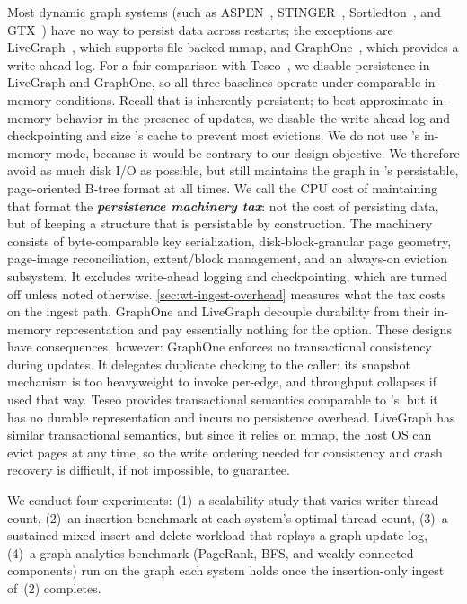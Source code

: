 Most dynamic graph systems (such as ASPEN~\cite{10.1145/3314221.3314598}, STINGER~\cite{stinger2012ediger}, Sortledton~\cite{sortledton2022Fuchs}, and GTX~\cite{libinzhou2025GTX}) have no way to persist data across restarts; the exceptions are LiveGraph~\cite{zhu2019livegraph}, which supports file-backed mmap, and GraphOne~\cite{graphone2019kumar}, which provides a write-ahead log.
For a fair comparison with Teseo~\cite{teseo2021deLeo}, we disable persistence in LiveGraph and GraphOne, so all three baselines operate under comparable in-memory conditions.
Recall that \project{} is inherently persistent; to best approximate in-memory behavior in the presence of updates, we disable the write-ahead log and checkpointing and size \wt{}'s cache to prevent most evictions.
We do not use \wt{}'s in-memory mode, because it would be contrary to our design objective.
We therefore avoid as much disk I/O as possible, but \project{} still maintains the graph in \wt{}'s persistable, page-oriented B-tree format at all times.
We call the CPU cost of maintaining that format the \textbf{\emph{persistence machinery tax}}: not the cost of persisting data, but of keeping a structure that is persistable by construction.
The machinery consists of byte-comparable key serialization, disk-block-granular page geometry, page-image reconciliation, extent/block management, and an always-on eviction subsystem.
It excludes write-ahead logging and checkpointing, which are turned off unless noted otherwise.
\autoref{sec:wt-ingest-overhead} measures what the tax costs on the ingest path.
GraphOne and LiveGraph decouple durability from their in-memory representation and pay essentially nothing for the option.
These designs have consequences, however: GraphOne enforces no transactional consistency during updates.
It delegates duplicate checking to the caller; its snapshot mechanism is too heavyweight to invoke per-edge, and throughput collapses if used that way.
Teseo provides transactional semantics comparable to \project{}'s, but it has no durable representation and incurs no persistence overhead.
LiveGraph has similar transactional semantics, but since it relies on mmap, the host OS can evict pages at any time, so the write ordering needed for consistency and crash recovery is difficult, if not impossible, to guarantee.

We conduct four experiments:
(1)~a scalability study that varies writer thread count,
(2)~an insertion benchmark at each system's optimal thread count,
(3)~a sustained mixed insert-and-delete workload that replays a graph
update log,
(4)~a graph analytics benchmark (PageRank, BFS, and weakly connected components) run on the graph each system holds once the insertion-only ingest of~(2) completes.

